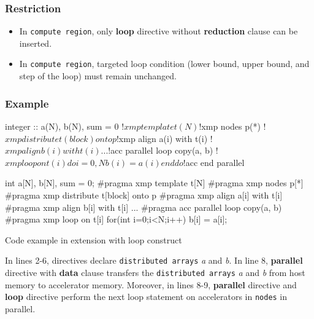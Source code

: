 \subsubsection*{Restriction}
\begin{itemize}
\item In {\OACC} {\tt compute region},
only {\XMP} {\bf loop} directive without {\bf reduction} clause can be inserted.
\item In {\OACC} {\tt compute region},
targeted loop condition (lower bound, upper bound, and step of the loop)
must remain unchanged.
\end{itemize}

\subsubsection*{Example}
\begin{myfigure}
\begin{minipage}{0.45\hsize}
\begin{center}
\begin{XACCFexampleL}
integer :: a(N), b(N), sum = 0
!$xmp template t(N)
!$xmp nodes p(*)
!$xmp distribute t(block) onto p
!$xmp align a(i) with t(i)
!$xmp align b(i) with t(i)
...
!$acc parallel loop copy(a, b)
!$xmp loop on t(i)
do i=0, N
  b(i) = a(i)
end do
!$acc end parallel
\end{XACCFexampleL}
\end{center}
\end{minipage}
%
\begin{minipage}{0.53\hsize}
\begin{center}
\begin{XACCCexampleR}
int a[N], b[N], sum = 0;
#pragma xmp template t[N]
#pragma xmp nodes p[*]
#pragma xmp distribute t[block] onto p
#pragma xmp align a[i] with t[i]
#pragma xmp align b[i] with t[i]
...
#pragma acc parallel loop copy(a, b)
#pragma xmp loop on t[i]
for(int i=0;i<N;i++){
  b[i] = a[i];
}

\end{XACCCexampleR}
\end{center}
\end{minipage}
\caption{Code example in {\XMP} extension with {\OACC} loop construct}\label{code:ex-oacc-loop}
\end{myfigure}

In lines 2-6,
{\XMP} directives declare {\tt distributed arrays} {\it a} and {\it b}.
In line 8,
{\OACC} {\bf parallel} directive with {\bf data} clause transfers the {\tt distributed arrays} {\it a} and {\it b} from host memory to accelerator memory.
Moreover,
in lines 8-9,
{\OACC} {\bf parallel} directive and {\XMP} {\bf loop} directive perform the next loop statement on accelerators in {\tt nodes} in parallel.

